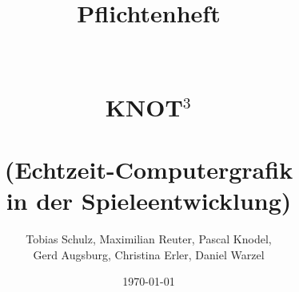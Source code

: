 \documentclass{scrreprt}
\begin{document}
\title{Pflichtenheft\\~\\~\\KNOT$^3$\\~\\(Echtzeit-Computergrafik\\in der Spieleentwicklung)}
\author{Tobias Schulz, Maximilian Reuter, Pascal Knodel, \\Gerd Augsburg, Christina Erler, Daniel Warzel} 
\date{\today}

\maketitle

\tableofcontents



















\end{document}
